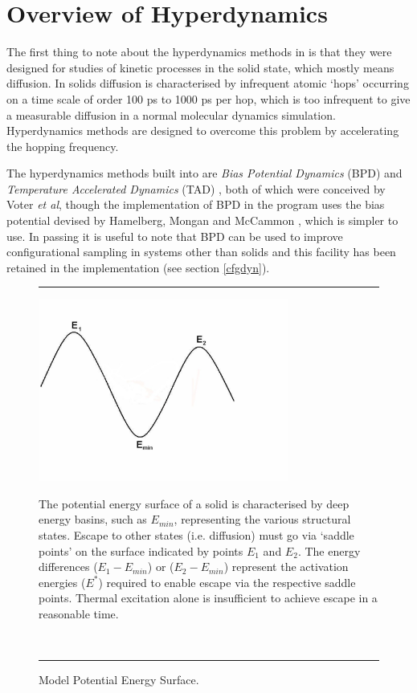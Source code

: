 \section{Overview of Hyperdynamics}
The first thing to note about the hyperdynamics methods in
\D{} is that they were designed for studies of kinetic processes in 
the solid state, which mostly means diffusion. In solids diffusion is
characterised by infrequent atomic `hops' occurring on a time scale of
order 100 ps to 1000 ps per hop, which is too infrequent to give a
measurable diffusion in a normal molecular dynamics
simulation. Hyperdynamics methods are designed to overcome this
problem by accelerating the hopping frequency.

The hyperdynamics methods built into \D{} are {\em Bias Potential
Dynamics} (BPD) \cite{voter-97a} and {\em Temperature Accelerated
Dynamics} (TAD) \cite{voter-00a}, both of which were conceived by
Voter {\em et al}, though the implementation of BPD in the program
uses the bias potential devised by Hamelberg, Mongan and McCammon
\cite{hamelberg-04a}, which is simpler to use. 
In passing it is useful to note that BPD can be used to improve
configurational sampling in systems other than solids and this
facility has been retained in the \D{} implementation (see section
\ref{cfgdyn}).

\begin{figure}[ht]
\hrule
\vspace{1.0cm}
\begin{center}
\includegraphics[height=6.0cm]{Hills.ps}
\end{center}
\caption{Model Potential Energy Surface.\label{potsurf}}
The potential energy surface of a solid is characterised by deep
energy basins, such as $E_{min}$, representing the various structural
states. Escape to other states (i.e. diffusion) must go via `saddle
points' on the surface indicated by points $E_{1}$ and $E_{2}$. The
energy differences ($E_{1}-E_{min}$) or ($E_{2}-E_{min}$) represent
the activation energies ($E^{*}$) required to enable escape via the
respective saddle points. Thermal excitation alone is insufficient to
achieve escape in a reasonable time.

~
\hrule
\end{figure}

